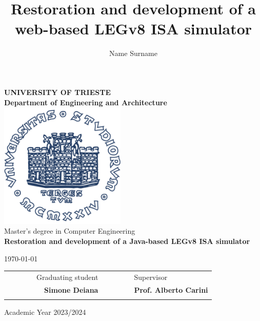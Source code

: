 \title{Restoration and development of a web-based LEGv8 ISA simulator}
\author{Name Surname}

\begin{titlepage}
    \begin{center}
    \BgThispage
    {\LARGE {\bfseries UNIVERSITY OF TRIESTE \\}}
    \vspace{.5cm}
    {\Large {\bfseries Department of Engineering and Architecture \\}}
    \vspace{1cm}
    \includegraphics[width=6cm,height=6cm]{img/units_logo.pdf}\\[1.5cm]

    {\LARGE
        Master's degree in Computer Engineering \\
    }
    \vspace{1cm}
    {\LARGE 
        {\bfseries Restoration and development of a Java-based LEGv8 ISA simulator}
    }
    \vspace{1cm}

    {\large \today \\
    }

    \vfill
    \begin{table}[h]
        {\large
            \begin{tabular}{c c c c r c c | c c l}
                & & & & Graduating student & & & & & Supervisor \\
                & & & & \bfseries Simone Deiana & & & & & \bfseries Prof. Alberto Carini \\ %
                & & & & & & & & & \\
            \end{tabular}
        }
    \end{table}
    Academic Year 2023/2024
    \end{center}
\end{titlepage}